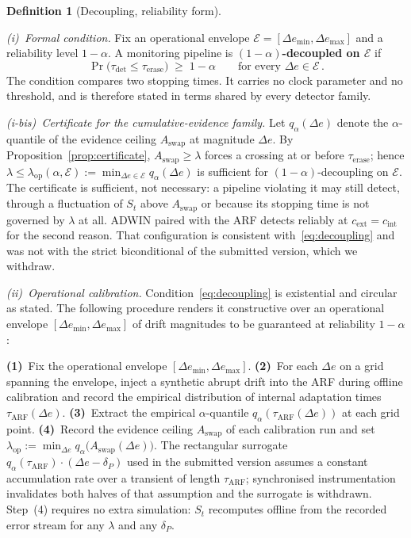 \documentclass[10pt,conference]{IEEEtran}
\theoremstyle{definition}
\newtheorem{definition}[theorem]{Definition}
\begin{document}
\begin{definition}[Decoupling, reliability form]\label{def:decoupling}

  \smallskip
  \emph{(i)~Formal condition.} Fix an operational envelope $\mathcal{E} = [\Delta e_{\min}, \Delta e_{\max}]$ and a reliability level $1-\alpha$. A monitoring pipeline is \textbf{$(1-\alpha)$-decoupled on $\mathcal{E}$} if
  \begin{equation}\label{eq:decoupling}
    \Pr\bigl(\tau_{\mathrm{det}} \le \tau_{\mathrm{erase}}\bigr) \;\ge\; 1-\alpha
    \qquad \text{for every } \Delta e \in \mathcal{E}\,.
  \end{equation}
  The condition compares two stopping times. It carries no clock parameter and no threshold, and is therefore stated in terms shared by every detector family.

  \smallskip
  \emph{(i-bis)~Certificate for the cumulative-evidence family.} Let $q_\alpha(\Delta e)$ denote the $\alpha$-quantile of the evidence ceiling $A_{\mathrm{swap}}$ at magnitude $\Delta e$. By Proposition~\ref{prop:certificate}, $A_{\mathrm{swap}} \ge \lambda$ forces a crossing at or before $\tau_{\mathrm{erase}}$; hence $\lambda \le \lambda_{\mathrm{op}}(\alpha, \mathcal{E}) := \min_{\Delta e \in \mathcal{E}} q_\alpha(\Delta e)$ is sufficient for $(1-\alpha)$-decoupling on $\mathcal{E}$. The certificate is sufficient, not necessary: a pipeline violating it may still detect, through a fluctuation of $S_t$ above $A_{\mathrm{swap}}$ or because its stopping time is not governed by $\lambda$ at all. ADWIN paired with the ARF detects reliably at $c_{\mathrm{ext}} = c_{\mathrm{int}}$ for the second reason. That configuration is consistent with~\eqref{eq:decoupling} and was not with the strict biconditional of the submitted version, which we withdraw.

  \smallskip
  \emph{(ii)~Operational calibration.} Condition~\eqref{eq:decoupling} is existential and circular as stated. The following procedure renders it constructive over an operational envelope $[\Delta e_{\min}, \Delta e_{\max}]$ of drift magnitudes to be guaranteed at reliability $1-\alpha$:

  \textbf{(1)}~Fix the operational envelope $[\Delta e_{\min}, \Delta e_{\max}]$. \textbf{(2)}~For each $\Delta e$ on a grid spanning the envelope, inject a synthetic abrupt drift into the ARF during offline calibration and record the empirical distribution of internal adaptation times $\tau_{\mathrm{ARF}}(\Delta e)$. \textbf{(3)}~Extract the empirical $\alpha$-quantile $q_{\alpha}(\tau_{\mathrm{ARF}}(\Delta e))$ at each grid point. \textbf{(4)}~Record the evidence ceiling $A_{\mathrm{swap}}$ of each calibration run and set $\lambda_{\mathrm{op}} := \min_{\Delta e} q_{\alpha}\bigl(A_{\mathrm{swap}}(\Delta e)\bigr)$. The rectangular surrogate $q_{\alpha}(\tau_{\mathrm{ARF}})\cdot(\Delta e - \delta_P)$ used in the submitted version assumes a constant accumulation rate over a transient of length $\tau_{\mathrm{ARF}}$; synchronised instrumentation invalidates both halves of that assumption and the surrogate is withdrawn. Step~(4) requires no extra simulation: $S_t$ recomputes offline from the recorded error stream for any $\lambda$ and any $\delta_P$.


\end{definition}
\end{document}
